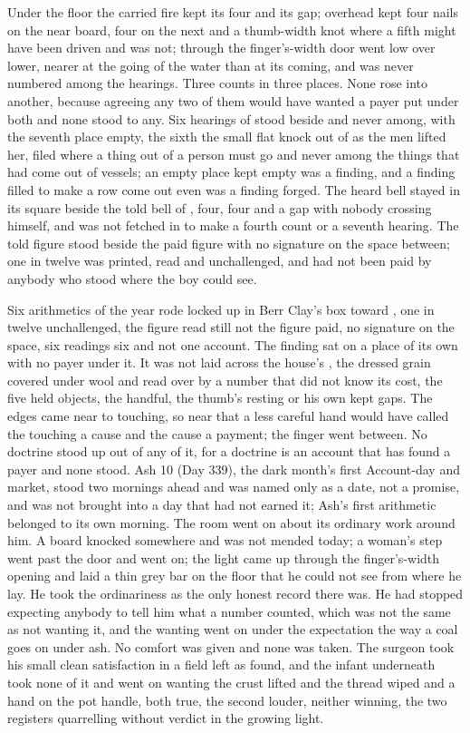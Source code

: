 Under the floor the carried fire kept its four and its gap; overhead  kept four nails on the near board, four on the next and a thumb-width knot where a fifth might have been driven and was not; through the finger's-width door  went low over lower, nearer at the going of the water than at its coming, and was never numbered among the hearings. Three counts in three places. None rose into another, because agreeing any two of them would have wanted a payer put under both and none stood to any. Six hearings of  stood beside and never among, with the seventh place empty, the sixth the small flat knock out of  as the men lifted her, filed where a thing out of a person must go and never among the things that had come out of vessels; an empty place kept empty was a finding, and a finding filled to make a row come out even was a finding forged. The heard bell stayed in its square beside the told bell of , four, four and a gap with nobody crossing himself, and was not fetched in to make a fourth count or a seventh hearing. The told figure stood beside the paid figure with no signature on the space between; one in twelve was printed, read and unchallenged, and had not been paid by anybody who stood where the boy could see.

Six arithmetics of the year rode locked up  in Berr Clay's box toward , one in twelve unchallenged, the figure read still not the figure paid, no signature on the space, six readings six and not one account. The finding sat on a place of its own with no payer under it. It was not laid across the house's , the dressed grain covered under wool and read over by a number that did not know its cost, the five held objects, the handful, the thumb's resting or his own kept gaps. The edges came near to touching, so near that a less careful hand would have called the touching a cause and the cause a payment; the finger went between. No doctrine stood up out of any of it, for a doctrine is an account that has found a payer and none stood. Ash 10 (Day 339), the dark month's first Account-day and market, stood two mornings ahead and was named only as a date, not a promise, and was not brought into a day that had not earned it; Ash's first arithmetic belonged to its own morning. The room went on about its ordinary work around him. A board knocked somewhere and was not mended today; a woman's step went past the door and went on; the light came up through the finger's-width opening and laid a thin grey bar on the floor that he could not see from where he lay. He took the ordinariness as the only honest record there was. He had stopped expecting anybody to tell him what a number counted, which was not the same as not wanting it, and the wanting went on under the expectation the way a coal goes on under ash. No comfort was given and none was taken. The surgeon took his small clean satisfaction in a field left as found, and the infant underneath took none of it and went on wanting the crust lifted and the thread wiped and a hand on the pot handle, both true, the second louder, neither winning, the two registers quarrelling without verdict in the growing light.

